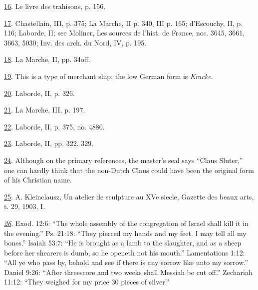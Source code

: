 \protect\hypertarget{23_NOTES.xhtmlux5cux23id_442}{\protect\hyperlink{20_ILLUSTRATIONS_FOLLOW_PAGE.xhtmlux5cux23id_441}{16}}.
Le livre des trahisons, p. 156.

\protect\hypertarget{23_NOTES.xhtmlux5cux23id_440}{\protect\hyperlink{20_ILLUSTRATIONS_FOLLOW_PAGE.xhtmlux5cux23id_439}{17}}.
Chastellain, III, p. 375; La Marche, II p. 340, III p. 165; d'Escouchy,
II, p. 116; Laborde, II; see Moliner, Les sources de l'hist. de France,
nos. 3645, 3661, 3663, 5030; Inv. des arch. du Nord, IV, p. 195.

\protect\hypertarget{23_NOTES.xhtmlux5cux23id_438}{\protect\hyperlink{20_ILLUSTRATIONS_FOLLOW_PAGE.xhtmlux5cux23id_437}{18}}.
La Marche, II, pp. 34off.

\protect\hypertarget{23_NOTES.xhtmlux5cux23id_436}{\protect\hyperlink{20_ILLUSTRATIONS_FOLLOW_PAGE.xhtmlux5cux23id_435}{19}}.
This is a type of merchant ship; the low German form is \emph{Kracke}.

\protect\hypertarget{23_NOTES.xhtmlux5cux23id_434}{\protect\hyperlink{20_ILLUSTRATIONS_FOLLOW_PAGE.xhtmlux5cux23id_433}{20}}.
Laborde, II, p. 326.

\protect\hypertarget{23_NOTES.xhtmlux5cux23id_432}{\protect\hyperlink{20_ILLUSTRATIONS_FOLLOW_PAGE.xhtmlux5cux23id_431}{21}}.
La Marche, III, p. 197.

\protect\hypertarget{23_NOTES.xhtmlux5cux23id_430}{\protect\hyperlink{20_ILLUSTRATIONS_FOLLOW_PAGE.xhtmlux5cux23id_429}{22}}.
Laborde, II, p. 375, no. 4880.

\protect\hypertarget{23_NOTES.xhtmlux5cux23id_428}{\protect\hyperlink{20_ILLUSTRATIONS_FOLLOW_PAGE.xhtmlux5cux23id_427}{23}}.
Laborde, II, pp. 322, 329.

\protect\hypertarget{23_NOTES.xhtmlux5cux23id_426}{\protect\hyperlink{20_ILLUSTRATIONS_FOLLOW_PAGE.xhtmlux5cux23id_425}{24}}.
Although on the primary references, the master's seal says ``Claus
Sluter,'' one can hardly think that the non-Dutch Claus could have been
the original form of his Christian name.

\protect\hypertarget{23_NOTES.xhtmlux5cux23id_424}{\protect\hyperlink{20_ILLUSTRATIONS_FOLLOW_PAGE.xhtmlux5cux23id_423}{25}}.
A. Kleinclausz, Un atelier de sculpture au XVe siecle, Gazette des beaux
arts, t. 29, 1903, I.

\emph{\protect\hypertarget{23_NOTES.xhtmlux5cux23id_422}{\protect\hyperlink{20_ILLUSTRATIONS_FOLLOW_PAGE.xhtmlux5cux23id_421}{26}}}.
Exod. 12:6: ``The whole assembly of the congregation of Israel shall
kill it in the evening.'' Ps. 21:18: ``They pierced my hands and my
feet. I may tell all my bones.'' Isaiah 53:7: ``He is brought as a lamb
to the slaughter, and as a sheep before her shearers is dumb, so he
openeth not his mouth.'' Lamentations 1:12: ``All ye who pass by, behold
and see if there is any sorrow like unto my sorrow.'' Daniel 9:26:
``After threescore and two weeks shall Messiah be cut off.'' Zechariah
11:12: ``They weighed for my price 30 pieces of silver.''

